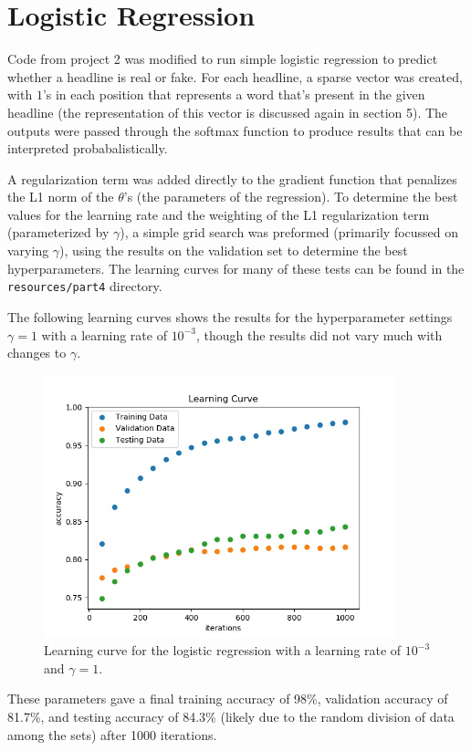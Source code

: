 \documentclass{article}
\begin{document}
   \section{Logistic Regression}
   Code from project 2 was modified to run simple logistic regression to predict whether a headline is real
   or fake. For each headline, a sparse vector was created, with $1$'s in each position that represents a word
   that's present in the given headline (the representation of this vector is discussed again in section 5).
   The outputs were passed through the softmax function to produce results that can be interpreted probabalistically.

   A regularization term was added directly to the gradient function that penalizes the L1 norm of the
   $\theta$'s (the parameters of the regression).
   To determine the best values for the learning rate and the weighting of the L1 regularization term (parameterized
   by $\gamma$), a simple grid search was preformed (primarily focussed on varying $\gamma$), using the results on
   the validation set to determine the best hyperparameters. The learning curves for many of these tests can be
   found in the \texttt{resources/part4} directory.

   The following learning curves shows the results for the hyperparameter settings $\gamma = 1$ with a learning
   rate of $10^{-3}$, though the results did not vary much with changes to $\gamma$.
   \begin{figure}[h] \centering
      \includegraphics[width=4in]{resources/part4}
      \caption{ Learning curve for the logistic regression with a learning rate of $10^{-3}$ and
            $\gamma = 1$.}
   \end{figure}

   These parameters gave a final training accuracy of 98\%, validation accuracy of 81.7\%, and testing
   accuracy of 84.3\% (likely due to the random division of data among the sets) after 1000 iterations.
\end{document}
